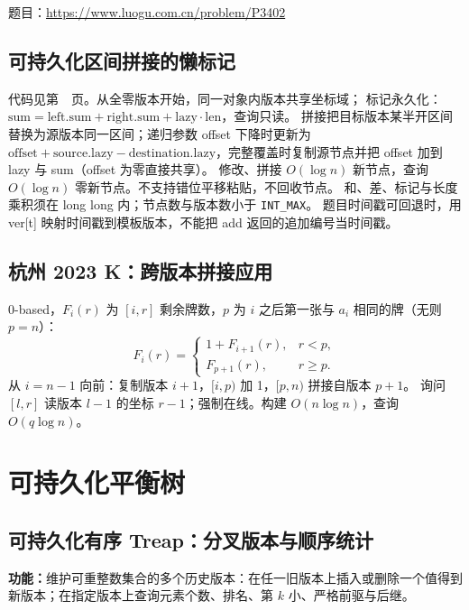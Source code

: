 题目：\url{https://www.luogu.com.cn/problem/P3402}



\subsection{可持久化区间拼接的懒标记}\label{knowledge-persistent-concat}
代码见第~\pageref{compact-PersistentRange}~页。从全零版本开始，同一对象内版本共享坐标域；
标记永久化：$\mathrm{sum}=\mathrm{left.sum}+\mathrm{right.sum}+\mathrm{lazy}\cdot\mathrm{len}$，查询只读。
拼接把目标版本某半开区间替换为源版本同一区间；递归参数 offset 下降时更新为
$\mathrm{offset}+\mathrm{source.lazy}-\mathrm{destination.lazy}$，完整覆盖时复制源节点并把 offset 加到 lazy 与 sum（offset 为零直接共享）。
修改、拼接 $O(\log n)$ 新节点，查询 $O(\log n)$ 零新节点。不支持错位平移粘贴，不回收节点。
和、差、标记与长度乘积须在 long long 内；节点数与版本数小于 \texttt{INT\_MAX}。
题目时间戳可回退时，用 ver[t] 映射时间戳到模板版本，不能把 add 返回的追加编号当时间戳。



\subsection{杭州 2023 K：跨版本拼接应用}\label{knowledge-hangzhou-k}
0-based，$F_i(r)$ 为 $[i,r]$ 剩余牌数，$p$ 为 $i$ 之后第一张与 $a_i$ 相同的牌（无则 $p=n$）：
\[
 F_i(r)=\begin{cases}
 1+F_{i+1}(r),&r<p,\\
 F_{p+1}(r),&r\ge p.
 \end{cases}
\]
从 $i=n-1$ 向前：复制版本 $i+1$，$[i,p)$ 加 1，$[p,n)$ 拼接自版本 $p+1$。
询问 $[l,r]$ 读版本 $l-1$ 的坐标 $r-1$；强制在线。构建 $O(n\log n)$，查询 $O(q\log n)$。


\Needspace{180pt}

\section{可持久化平衡树}

\subsection{可持久化有序 Treap：分叉版本与顺序统计}\label{compact-PersistentOrderedTreap}

\noindent\textbf{功能：}\allowbreak 维护可重整数集合的多个历史版本：在任一旧版本上插入或删除一个值得到新版本；在指定版本上查询元素个数、排名、第 $k$ 小、严格前驱与后继。

